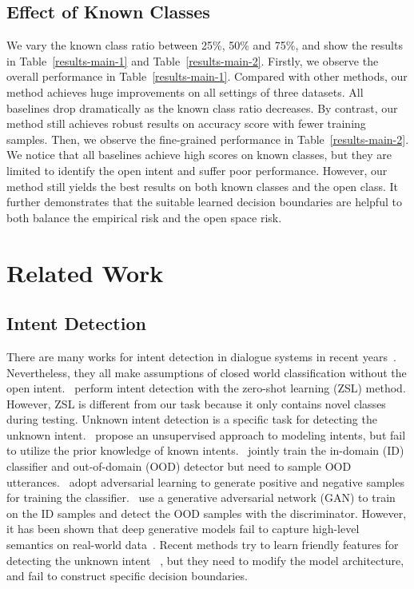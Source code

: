 \documentclass[letterpaper]{article} %
\begin{document}
\subsection{Effect of Known Classes}
We vary the known class ratio between 25\%, 50\% and 75\%, and show the results in Table~\ref{results-main-1} and Table~\ref{results-main-2}. Firstly, we observe the overall performance in Table~\ref{results-main-1}. Compared with other methods, our method achieves huge improvements on all settings of three datasets. All baselines drop dramatically as the known class ratio decreases. By contrast, our method still achieves robust results on accuracy score with fewer training samples.  Then, we observe the fine-grained performance in Table~\ref{results-main-2}. We notice that all baselines achieve high scores on known classes, but they are limited to identify the open intent and suffer poor performance. However, our method still yields the best results on both known classes and the open class. It further demonstrates that the suitable learned decision boundaries are helpful to both balance the empirical risk and the open space risk.

\section{Related Work}
\subsection{Intent Detection}
There are many works for intent detection in dialogue systems in recent years~\cite{ijcai2020-532,Qin_Che_Li_Ni_Liu_2020,zhang-etal-2019-joint,e-etal-2019-novel,qin-etal-2019-stack}. Nevertheless, they all make assumptions of closed world classification without the open intent.~\citet{srivastava-etal-2018-zero} perform intent detection with the zero-shot learning (ZSL) method. However, ZSL is different from our task because it only contains novel classes during testing.  Unknown intent detection is a specific task for detecting the unknown intent.~\citet{Brychcin2017UnsupervisedDA} propose an unsupervised approach to modeling intents,  but fail to utilize the prior knowledge of known intents.~\citet{Kim2018JointLO} jointly train the in-domain (ID) classifier and out-of-domain (OOD) detector but need to sample OOD utterances.~\citet{Yu2017OpenCategoryCB} adopt adversarial learning to generate positive and negative samples for training the classifier.~\citet{ryu-etal-2018-domain} use a generative adversarial network (GAN) to train on the ID samples and detect the OOD samples with the discriminator. However, it has been shown that deep generative models fail to capture high-level semantics on real-world data~\cite{2018arXiv181009136N,Mundt_2019_ICCV}. Recent methods try to learn friendly features for detecting the unknown intent ~\cite{lin-xu-2019-deep,gangal2020likelihood,yan-etal-2020-unknown}, but they need to modify the  model architecture, and fail to construct specific decision boundaries.
\end{document}
